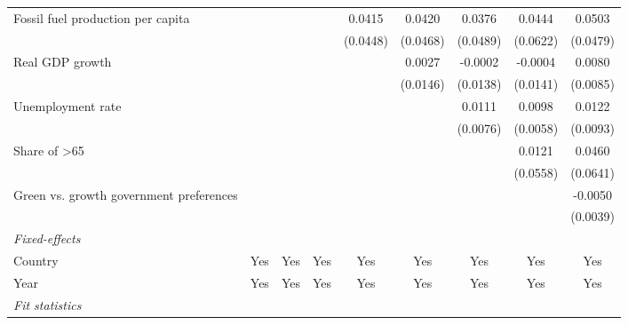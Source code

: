 \begin{table}[htbp]
\begin{tabular}{lcccccccc}
      Fossil fuel production per capita       &                 &                &             & 0.0415      & 0.0420   & 0.0376       & 0.0444        & 0.0503\\   
                                              &                 &                &             & (0.0448)    & (0.0468) & (0.0489)     & (0.0622)      & (0.0479)\\   
      Real GDP growth                         &                 &                &             &             & 0.0027   & -0.0002      & -0.0004       & 0.0080\\   
                                              &                 &                &             &             & (0.0146) & (0.0138)     & (0.0141)      & (0.0085)\\   
      Unemployment rate                       &                 &                &             &             &          & 0.0111       & 0.0098        & 0.0122\\   
                                              &                 &                &             &             &          & (0.0076)     & (0.0058)      & (0.0093)\\   
      Share of >65                            &                 &                &             &             &          &              & 0.0121        & 0.0460\\   
                                              &                 &                &             &             &          &              & (0.0558)      & (0.0641)\\   
      Green vs. growth government preferences &                 &                &             &             &          &              &               & -0.0050\\   
                                              &                 &                &             &             &          &              &               & (0.0039)\\   
      \midrule
      \emph{Fixed-effects}\\
      Country                                 & Yes             & Yes            & Yes         & Yes         & Yes      & Yes          & Yes           & Yes\\  
      Year                                    & Yes             & Yes            & Yes         & Yes         & Yes      & Yes          & Yes           & Yes\\  
      \midrule
      \emph{Fit statistics}\\

\end{tabular}
\end{table}
